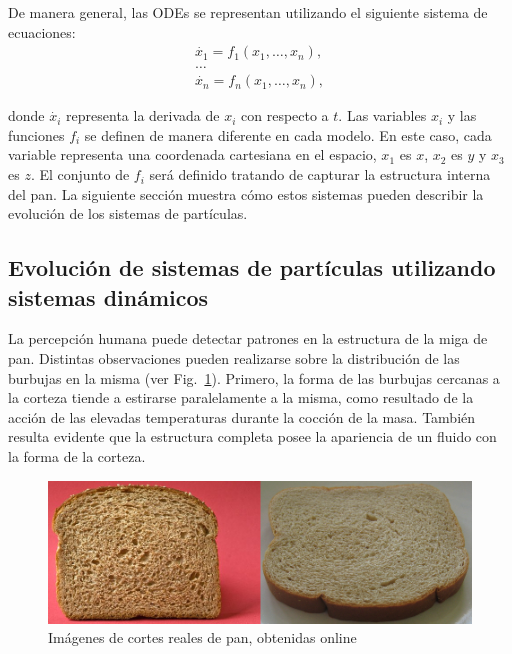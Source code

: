 De manera general, las ODEs se representan utilizando el siguiente sistema de ecuaciones:
\begin{equation} \label{eq:simple}  
  \begin{aligned}
    \dot{x_{1}} = f_{1}(x_{1},\ldots,x_{n}),\\
    \ldots\\
    \dot{x_{n}} = f_{n}(x_{1},\ldots,x_{n}),
  \end{aligned}
\end{equation}

\noindent donde $\dot{x_{i}}$ representa la derivada de $x_{i}$ con respecto
a $t$.
Las variables $x_{i}$ y las funciones $f_{i}$ se definen de manera diferente en cada modelo.
En este caso, cada variable representa una coordenada cartesiana en el espacio, $x_{1}$ es $x$, $x_{2}$ es $y$ y $x_{3}$ es $z$.
El conjunto de $f_{i}$ ser\'a definido tratando de capturar la estructura interna del pan. 
La siguiente secci\'on muestra cómo estos sistemas pueden describir la evoluci\'on de los sistemas de part\'iculas.

\subsection{Evoluci\'on de sistemas de part\'iculas utilizando sistemas din\'amicos}

La percepci\'on humana puede detectar patrones en la estructura de la miga de pan. Distintas observaciones pueden realizarse sobre la distribuci\'on de las burbujas en la misma (ver Fig.~\ref{fg:panreal}).
Primero, la forma de las burbujas cercanas a la corteza tiende a estirarse paralelamente a la misma, como resultado de la acci\'on de las elevadas temperaturas durante la cocci\'on de la masa.
Tambi\'en resulta evidente que la estructura completa posee la apariencia de un fluido con la forma de la corteza.


\begin{figure}[htb!]
  \centerline{\includegraphics[width=13cm]{figures/panreal}}
  \caption[Imágenes de cortes reales de pan]{Imágenes de cortes reales de pan, obtenidas online\protect\footnotemark \protect\footnotemark  }
  \label{fg:panreal}
\end{figure}


